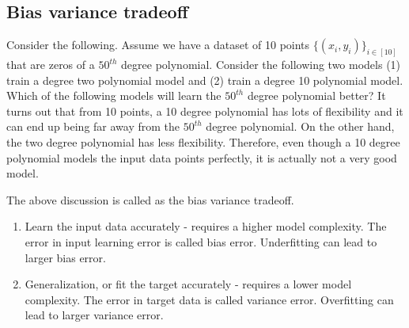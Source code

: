 \subsection{Bias variance tradeoff}
Consider the following.  Assume we have a dataset of 10 points $\{(x_i,y_i)\}_{i \in [10]}$ that are zeros of a $50^{th}$ degree polynomial. Consider the following two models (1) train a degree two polynomial model and (2) train a degree 10 polynomial model. Which of the following models will learn the $50^{th}$ degree polynomial better? It turns out that from 10 points, a 10 degree polynomial has lots of flexibility and it can end up being far away from the $50^{th}$ degree polynomial. On the other hand, the two degree polynomial has less flexibility. Therefore, even though a 10 degree polynomial models the input data points perfectly, it is actually not a very good model. 

The above discussion is called as the bias variance tradeoff.
\begin{enumerate}
\item Learn the input data accurately - requires a higher model complexity. The error in input learning error is called bias error. Underfitting can lead to larger bias error.
\item Generalization, or fit the target accurately - requires a lower model complexity. The error in target data is called variance error. Overfitting can lead to larger variance error.
\end{enumerate}

